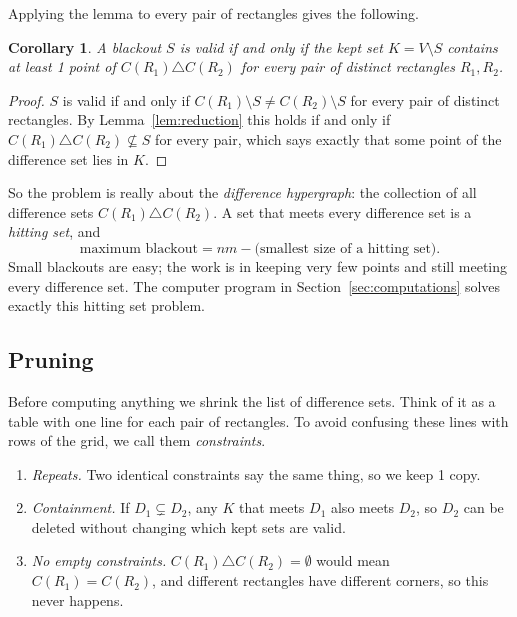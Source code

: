 \documentclass[11pt]{article}
\newtheorem{corollary}[theorem]{Corollary}
\theoremstyle{definition}
\theoremstyle{remark}
\begin{document}
Applying the lemma to every pair of rectangles gives the following.

\begin{corollary}\label{cor:hitting}
A blackout $S$ is valid if and only if the kept set $K=V\setminus S$ contains at least 1 point
of $C(R_1)\triangle C(R_2)$ for every pair of distinct rectangles $R_1,R_2$.
\end{corollary}

\begin{proof}
$S$ is valid if and only if $C(R_1)\setminus S\ne C(R_2)\setminus S$ for every pair of distinct
rectangles. By Lemma~\ref{lem:reduction} this holds if and only if
$C(R_1)\triangle C(R_2)\not\subseteq S$ for every pair, which says exactly that some point of
the difference set lies in $K$.
\end{proof}

So the problem is really about the \emph{difference hypergraph}: the collection of all
difference sets $C(R_1)\triangle C(R_2)$. A set that meets every difference set is a
\emph{hitting set}, and
\[
\text{maximum blackout}=nm-\text{(smallest size of a hitting set)}.
\]
Small blackouts are easy; the work is in keeping very few points and still meeting every
difference set. The computer program in Section~\ref{sec:computations} solves exactly this
hitting set problem.

\subsection{Pruning}\label{sec:pruning}

Before computing anything we shrink the list of difference sets. Think of it as a table with one
line for each pair of rectangles. To avoid confusing these lines with rows of the grid, we call
them \emph{constraints}.

\begin{enumerate}[leftmargin=*,itemsep=1pt]
\item \emph{Repeats.} Two identical constraints say the same thing, so we keep 1 copy.
\item \emph{Containment.} If $D_1\subsetneq D_2$, any $K$ that meets $D_1$ also meets $D_2$, so
$D_2$ can be deleted without changing which kept sets are valid.
\item \emph{No empty constraints.} $C(R_1)\triangle C(R_2)=\emptyset$ would mean
$C(R_1)=C(R_2)$, and different rectangles have different corners, so this never happens.
\end{enumerate}
\end{document}
